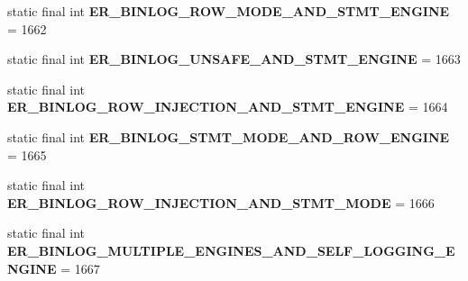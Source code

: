 \begin{DoxyCompactItemize}
\item 
\mbox{\label{classcom_1_1mysql_1_1cj_1_1exceptions_1_1_mysql_error_numbers_a0d467a2ef7111144c56d16ae68d5d76a}} 
static final int {\bfseries E\+R\+\_\+\+B\+I\+N\+L\+O\+G\+\_\+\+R\+O\+W\+\_\+\+M\+O\+D\+E\+\_\+\+A\+N\+D\+\_\+\+S\+T\+M\+T\+\_\+\+E\+N\+G\+I\+NE} = 1662
\item 
\mbox{\label{classcom_1_1mysql_1_1cj_1_1exceptions_1_1_mysql_error_numbers_ac695a54b31418b8db05964d78efaede1}} 
static final int {\bfseries E\+R\+\_\+\+B\+I\+N\+L\+O\+G\+\_\+\+U\+N\+S\+A\+F\+E\+\_\+\+A\+N\+D\+\_\+\+S\+T\+M\+T\+\_\+\+E\+N\+G\+I\+NE} = 1663
\item 
\mbox{\label{classcom_1_1mysql_1_1cj_1_1exceptions_1_1_mysql_error_numbers_a4754cd6d02e31254d62ff750bfd6e5f0}} 
static final int {\bfseries E\+R\+\_\+\+B\+I\+N\+L\+O\+G\+\_\+\+R\+O\+W\+\_\+\+I\+N\+J\+E\+C\+T\+I\+O\+N\+\_\+\+A\+N\+D\+\_\+\+S\+T\+M\+T\+\_\+\+E\+N\+G\+I\+NE} = 1664
\item 
\mbox{\label{classcom_1_1mysql_1_1cj_1_1exceptions_1_1_mysql_error_numbers_afb69b9cd22e8bdd6b6e29bcf1a771140}} 
static final int {\bfseries E\+R\+\_\+\+B\+I\+N\+L\+O\+G\+\_\+\+S\+T\+M\+T\+\_\+\+M\+O\+D\+E\+\_\+\+A\+N\+D\+\_\+\+R\+O\+W\+\_\+\+E\+N\+G\+I\+NE} = 1665
\item 
\mbox{\label{classcom_1_1mysql_1_1cj_1_1exceptions_1_1_mysql_error_numbers_a3dc6934cc594299155b202403fbba501}} 
static final int {\bfseries E\+R\+\_\+\+B\+I\+N\+L\+O\+G\+\_\+\+R\+O\+W\+\_\+\+I\+N\+J\+E\+C\+T\+I\+O\+N\+\_\+\+A\+N\+D\+\_\+\+S\+T\+M\+T\+\_\+\+M\+O\+DE} = 1666
\item 
\mbox{\label{classcom_1_1mysql_1_1cj_1_1exceptions_1_1_mysql_error_numbers_a93b80b0e4b1c576ff9acfefc24bbdefd}} 
static final int {\bfseries E\+R\+\_\+\+B\+I\+N\+L\+O\+G\+\_\+\+M\+U\+L\+T\+I\+P\+L\+E\+\_\+\+E\+N\+G\+I\+N\+E\+S\+\_\+\+A\+N\+D\+\_\+\+S\+E\+L\+F\+\_\+\+L\+O\+G\+G\+I\+N\+G\+\_\+\+E\+N\+G\+I\+NE} = 1667
\item 

\end{DoxyCompactItemize}
